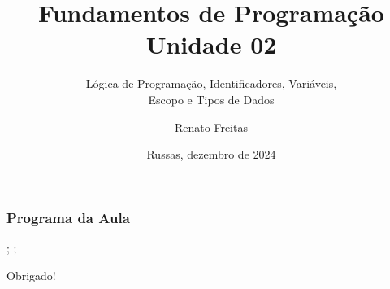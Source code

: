 \documentclass[11pt]{beamer}
\begin{document}
	\title{Fundamentos de Programação \\ Unidade 02}
	\subtitle{Lógica de Programação, Identificadores, Variáveis,\\Escopo e Tipos de Dados}
	\author{Renato Freitas}
	\date{Russas, dezembro de 2024}
	\begin{frame}[plain]
		\maketitle
	\end{frame}
	
	
	\begin{frame}
		\frametitle{Programa da Aula}
		\tableofcontents
	\end{frame}

%
	;
	;
%	
%	
%	


	\begin{frame}[plain]
		\maketitle
		\centering
		Obrigado!
	\end{frame}
\end{document}
